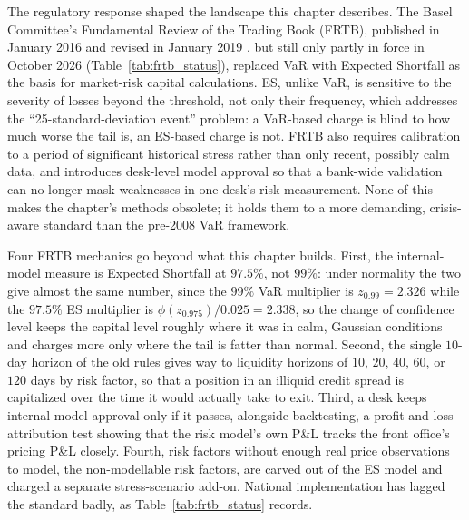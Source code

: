 \documentclass[../ai_in_finance]{subfiles}
\begin{document}
The regulatory response shaped the landscape this chapter describes.
The Basel Committee's Fundamental Review of the Trading Book (FRTB), published in January 2016 and revised in January 2019 \parencite{bcbs2016minimum}, but still only partly in force in October 2026 (Table~\ref{tab:frtb_status}), replaced VaR with Expected Shortfall as the basis for market-risk capital calculations. ES, unlike VaR, is sensitive to the severity of losses beyond the threshold, not only their frequency, which addresses the ``25-standard-deviation event'' problem: a VaR-based charge is blind to how much worse the tail is, an ES-based charge is not.
FRTB also requires calibration to a period of significant historical stress rather than only recent, possibly calm data, and introduces desk-level model approval so that a bank-wide validation can no longer mask weaknesses in one desk's risk measurement. None of this makes the chapter's methods obsolete; it holds them to a more demanding, crisis-aware standard than the pre-2008 VaR framework.

Four FRTB mechanics go beyond what this chapter builds. First, the internal-model measure is Expected Shortfall at $97.5\%$, not $99\%$: under normality the two give almost the same number, since the $99\%$ VaR multiplier is $z_{0.99}=2.326$ while the $97.5\%$ ES multiplier is $\phi(z_{0.975})/0.025 = 2.338$, so the change of confidence level keeps the capital level roughly where it was in calm, Gaussian conditions and charges more only where the tail is fatter than normal. Second, the single $10$-day horizon of the old rules gives way to liquidity horizons of $10$, $20$, $40$, $60$, or $120$ days by risk factor, so that a position in an illiquid credit spread is capitalized over the time it would actually take to exit. Third, a desk keeps internal-model approval only if it passes, alongside backtesting, a profit-and-loss attribution test showing that the risk model's own P\&L tracks the front office's pricing P\&L closely. Fourth, risk factors without enough real price observations to model, the non-modellable risk factors, are carved out of the ES model and charged a separate stress-scenario add-on. National implementation has lagged the standard badly, as Table~\ref{tab:frtb_status} records.
\end{document}
